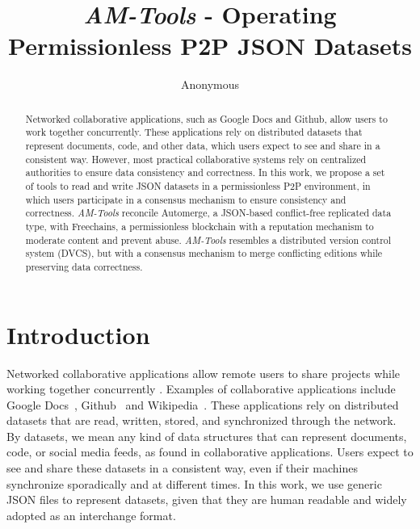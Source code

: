 \documentclass[12pt]{article}
\title{
    \emph{AM-Tools} - Operating Permissionless P2P JSON Datasets
}
\author{Anonymous}
\begin{document}
\begin{comment}
- Descrição e motivação do problema resolvido pela ferramenta;
- Arquitetura da solução e descrição das principais funcionalidades;
- Descrição da demonstração planejada para o Salão de Ferramentas, informando equipamentos necessários para tal;
- URL onde a ferramenta está disponível (obrigatório na modalidade Código Aberto);
- URL dos manuais e documentação da ferramenta, incluindo informações e requisitos para instalação (obrigatório na modalidade Código Aberto);
- URL com um vídeo explicando a instalação e as funcionalidades da ferramenta (obrigatório na modalidade Código Fechado e opcional na modalidade Código Aberto).
\end{comment}

\maketitle

\begin{abstract}
Networked collaborative applications, such as Google Docs and Github, allow
users to work together concurrently.
These applications rely on distributed datasets that represent documents, code,
and other data, which users expect to see and share in a consistent way.
However, most practical collaborative systems rely on centralized authorities
to ensure data consistency and correctness.
%
In this work, we propose a set of tools to read and write JSON datasets in a
permissionless P2P environment, in which users participate in a consensus
mechanism to ensure consistency and correctness.
%
\emph{AM-Tools} reconcile Automerge, a JSON-based conflict-free replicated data
type, with Freechains, a permissionless blockchain with a reputation mechanism
to moderate content and prevent abuse.
%
\emph{AM-Tools} resembles a distributed version control system (DVCS), but with
a consensus mechanism to merge conflicting editions while preserving data
correctness.
\end{abstract}

\section{Introduction}
\label{sec.introduction}

Networked collaborative applications allow remote users to share projects while
working together concurrently \cite{wu2010partial}.
Examples of collaborative applications include Google
Docs~\cite{attebury2008google}, Github~\cite{preston2008github} and
Wikipedia~\cite{wikipedia2004wikipedia}.
%
These applications rely on distributed datasets that are read, written, stored,
and synchronized through the network.
By datasets, we mean any kind of data structures that can represent documents,
code, or social media feeds, as found in collaborative applications.
Users expect to see and share these datasets in a consistent way, even if their
machines synchronize sporadically and at different times.
%
In this work, we use generic JSON files to represent datasets, given that they
are human readable and widely adopted as an interchange format.
\end{document}
